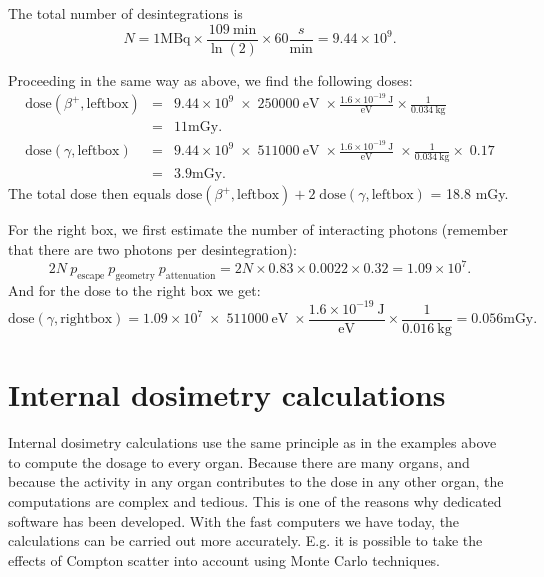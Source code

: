 The total number of desintegrations is 
\begin{equation}
  N = 1 \mbox{MBq} \times \frac{109\ \mbox{min}}{\ln(2)} \times 60
    \frac{s}{\mbox{min}} = 9.44 \times 10^9.
\end{equation}

Proceeding in the same way as above, we find the following doses:
\begin{eqnarray}
\mbox{dose}(\beta^+,\mbox{leftbox}) & = & 9.44 \times 10^9 \; \times \; 250000
    \ \mbox{eV} \; \times \frac{1.6 \times 10^{-19} \ \mbox{J}}{\mbox{eV}}
        \times \frac{1}{0.034 \ \mbox{kg}}  \nonumber\\
     & = & 11 \mbox{mGy}.  \\
\mbox{dose}(\gamma, \mbox{leftbox}) & = & 9.44 \times 10^9 \; \times
    \; 511000 \ \mbox{eV} \;
    \times \frac{1.6 \times 10^{-19} \ \mbox{J}}{\mbox{eV}} \;
     \times \frac{1}{0.034\ \mbox{kg}} \times \; 0.17 \nonumber\\
     & = & 3.9 \mbox{mGy}.
\end{eqnarray}
The total dose then equals $\mbox{dose}(\beta^+,\mbox{leftbox}) + 2 \;
\mbox{dose}(\gamma, \mbox{leftbox})$ = 18.8 mGy.

For the right box, we first estimate the number of interacting photons
(remember that there are two photons per desintegration):
\begin{equation}
  2N \ p_{\mbox{escape}}\ p_{\mbox{geometry}}\ p_{\mbox{attenuation}}
   = 2N \times 0.83 \times 0.0022 \times 0.32 = 1.09 \times 10^7.
\end{equation}
And for the dose to the right box we get:
\begin{equation}
\mbox{dose}(\gamma, \mbox{rightbox}) = 1.09 \times 10^7\; \times \; 511000 \ \mbox{eV} \;
  \times \frac{1.6 \times 10^{-19} \ \mbox{J}}{\mbox{eV}}  \times \frac{1}{0.016\ \mbox{kg}}
   = 0.056 \mbox{mGy}.
\end{equation}


\section{Internal dosimetry calculations}
Internal dosimetry calculations use the same principle as in the
examples above to compute the dosage to every organ. Because there are
many organs, and because the activity in any organ contributes to the
dose in any other organ, the computations are complex and tedious.
This is one of the reasons why dedicated software has been developed.
With the fast computers we have today, the calculations can be carried
out more accurately. E.g.  it is possible to take the effects of
Compton scatter into account using Monte Carlo techniques.

